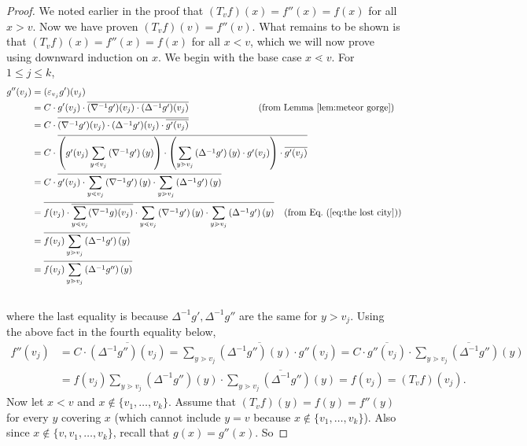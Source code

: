 \documentclass[ALCO,ThmDefs,Unicode,epreuves]{cedram}
\newcommand{\e}{\varepsilon}
\newcommand{\down}{\nabla}
\newcommand{\up}{\Delta}
\begin{document}
\begin{proof}
We noted earlier in the proof that
$(T_v f)(x)=f''(x)=f(x)$ for all $x>v$. Now we have proven
$(T_v f)(v)=f''(v)$. What remains to be shown is that
$(T_v f)(x)=f''(x)=f(x)$ for all $x<v$, which we will now prove
using downward induction on $x$. We begin with the base case $x\lessdot v$. For $1\leq j\leq k$,
\begin{align*}
g''(v_j) &= (\e_{v_j}g')(v_j)\\
&=
C\cdot g'(v_j) \cdot \overline{(\down^{-1}g')(v_j)\cdot(\up^{-1}g')(v_j)}
\hspace{1.05 in}\text{(from Lemma~\ref{lem:meteor gorge})}
\\
&= C\cdot
\overline{(\down^{-1}g')(v_j)\cdot(\up^{-1}g')(v_j) \cdot
\overline{g'(v_j)}}
\\
&= C\cdot
\overline{\left(g'(v_j)\sum\limits_{y\lessdot v_j}\left(\down^{-1}g'\right)(y)\right)\cdot
\left(\sum\limits_{y\gtrdot v_j}\left(\up^{-1}g'\right)(y)\cdot g'(v_j)\right) \cdot
\overline{g'(v_j)}}
\\
&= C\cdot
\overline{g'(v_j)\cdot\sum\limits_{y\lessdot v_j}\left(\down^{-1}g'\right)(y)\cdot
\sum\limits_{y\gtrdot v_j}\left(\up^{-1}g'\right)(y)}
\\
&=
\overline{
f(v_j)\cdot\overline{\sum\limits_{y\lessdot v_j}(\down^{-1}g)(v_j)}
\cdot\sum\limits_{y\lessdot v_j}\left(\down^{-1}g'\right)(y)
\cdot\sum\limits_{y\gtrdot v_j}\left(\up^{-1}g'\right)(y)}
\hspace{0.15 in} \text{(from Eq.~(\ref{eq:the lost city}))}
\\
&=
\overline{
f(v_j)\sum\limits_{y\gtrdot v_j}\left(\up^{-1}g'\right)(y)}
\\
&=
\overline{
f(v_j)\sum\limits_{y\gtrdot v_j}\left(\up^{-1}g''\right)(y)}
\end{align*}\vspace{-0.1 in}\\
where the last equality is because $\up^{-1}g', \up^{-1}g''$ are the same for $y>v_j$.
Using the above fact in the fourth equality below,
\begin{align*}
f''(v_j)
&=C\cdot \overline{(\up^{-1}g'')(v_j)}
=\overline{\sum\limits_{y\gtrdot v_j}(\up^{-1}g'')(y)\cdot g''(v_j)}
= C\cdot 
\overline{g''(v_j)}\cdot \overline{\sum\limits_{y\gtrdot v_j}(\up^{-1}g'')(y)}\\
&=f(v_j)\sum\limits_{y\gtrdot v_j}\left(\up^{-1}g''\right)(y)\cdot \overline{\sum\limits_{y\gtrdot v_j}(\up^{-1}g'')(y)}
= f(v_j)=(T_v f)(v_j).
\end{align*}
Now let $x<v$ and $x\not\in\{v_1,\dots,v_k\}$.
Assume that $(T_v f)(y)=f(y)=f''(y)$ for every $y$ covering $x$ (which cannot include $y=v$ because $x\not\in\{v_1,\dots,v_k\}$).
Also since $x\not\in\{v,v_1,\dots,v_k\}$, recall that $g(x)=g''(x)$. So


\end{proof}
\end{document}
